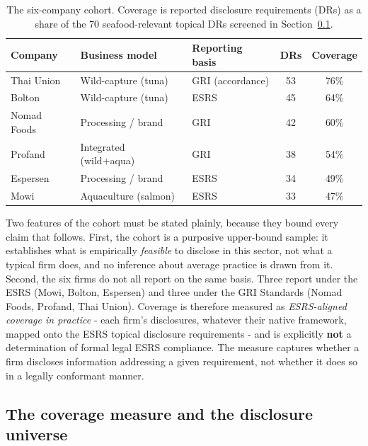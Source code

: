 \documentclass[
]{article}
\begin{document}
\begin{table}[ht]
\centering
\caption{The six-company cohort. Coverage is reported disclosure
requirements (DRs) as a share of the 70 seafood-relevant topical DRs
screened in Section~\ref{cohort-method}.}
\label{tab:cohort-r} %
\begin{tabular}{@{}lllcc@{}}
\toprule
\textbf{Company} & \textbf{Business model} & \textbf{Reporting basis} &
\textbf{DRs} & \textbf{Coverage} \\
\midrule
Thai Union & Wild-capture (tuna)     & GRI (accordance) & 53 & 76\% \\
Bolton     & Wild-capture (tuna)     & ESRS             & 45 & 64\% \\
Nomad Foods& Processing / brand      & GRI              & 42 & 60\% \\
Profand    & Integrated (wild+aqua)  & GRI              & 38 & 54\% \\
Espersen   & Processing / brand      & ESRS             & 34 & 49\% \\
Mowi       & Aquaculture (salmon)    & ESRS             & 33 & 47\% \\
\bottomrule
\end{tabular}
\end{table}

Two features of the cohort must be stated plainly, because they bound
every claim that follows. First, the cohort is a purposive upper-bound
sample: it establishes what is empirically \emph{feasible} to disclose in
this sector, not what a typical firm does, and no inference about average
practice is drawn from it. Second, the six firms do not all report on the
same basis. Three report under the ESRS (Mowi, Bolton, Espersen) and
three under the GRI Standards (Nomad Foods, Profand, Thai Union). Coverage
is therefore measured as \emph{ESRS-aligned coverage in practice} - each
firm's disclosures, whatever their native framework, mapped onto the ESRS
topical disclosure requirements - and is explicitly \textbf{not} a
determination of formal legal ESRS compliance. The measure captures
whether a firm discloses information addressing a given requirement, not
whether it does so in a legally conformant manner.

\subsection{The coverage measure and the disclosure
universe}\label{cohort-method}
\end{document}
